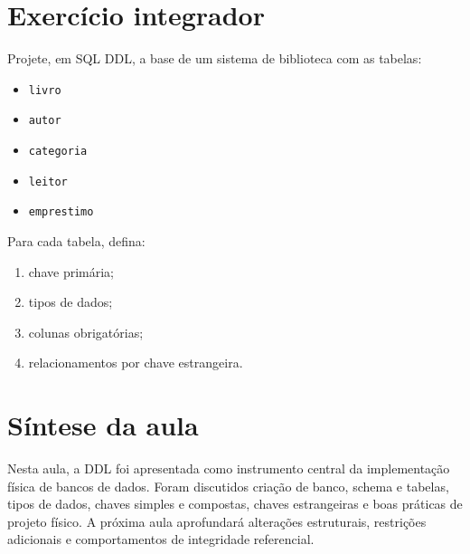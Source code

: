 \section{Exercício integrador}

Projete, em SQL DDL, a base de um sistema de biblioteca com as tabelas:
\begin{itemize}
    \item \texttt{livro}
    \item \texttt{autor}
    \item \texttt{categoria}
    \item \texttt{leitor}
    \item \texttt{emprestimo}
\end{itemize}

Para cada tabela, defina:
\begin{enumerate}
    \item chave primária;
    \item tipos de dados;
    \item colunas obrigatórias;
    \item relacionamentos por chave estrangeira.
\end{enumerate}

\section{Síntese da aula}

Nesta aula, a DDL foi apresentada como instrumento central da implementação física de bancos de dados. Foram discutidos criação de banco, schema e tabelas, tipos de dados, chaves simples e compostas, chaves estrangeiras e boas práticas de projeto físico. A próxima aula aprofundará alterações estruturais, restrições adicionais e comportamentos de integridade referencial.
